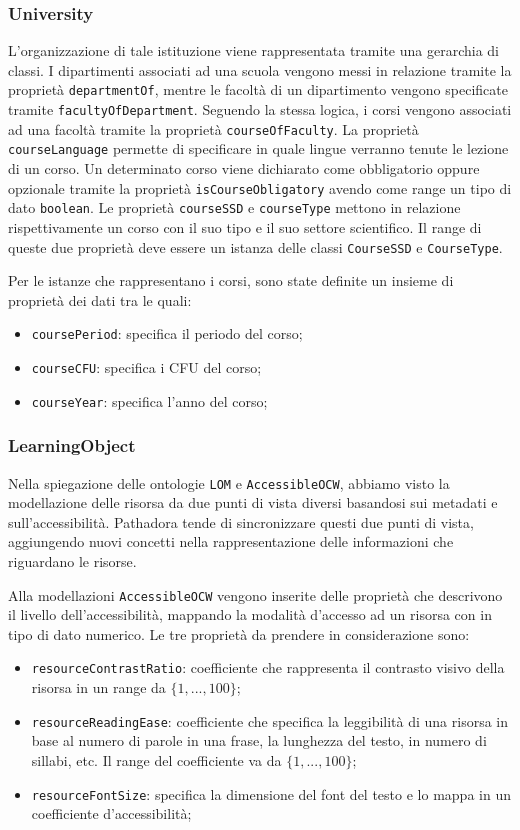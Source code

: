 \subsubsection{University}
L'organizzazione di tale istituzione viene rappresentata tramite una gerarchia di classi. I dipartimenti associati ad una scuola vengono messi in relazione tramite la proprietà \texttt{departmentOf}, mentre le facoltà di un dipartimento vengono specificate tramite \texttt{facultyOfDepartment}. Seguendo la stessa logica, i corsi vengono associati ad una facoltà tramite la proprietà \texttt{courseOfFaculty}. La proprietà \texttt{courseLanguage} permette di specificare in quale lingue verranno tenute le lezione di un corso. Un determinato corso viene dichiarato come obbligatorio oppure opzionale tramite la proprietà \texttt{isCourseObligatory} avendo come range un tipo di dato \texttt{boolean}. Le proprietà \texttt{courseSSD} e \texttt{courseType} mettono in relazione rispettivamente un corso con il suo tipo e il suo settore scientifico. Il range di queste due proprietà deve essere un istanza delle classi \texttt{CourseSSD} e \texttt{CourseType}. 

Per le istanze che rappresentano i corsi, sono state definite un insieme di proprietà dei dati tra le quali:
\begin{itemize}
    \item \texttt{coursePeriod}: specifica il periodo del corso;
    \item \texttt{courseCFU}: specifica i CFU del corso;
    \item \texttt{courseYear}: specifica l'anno del corso;
\end{itemize}

\subsubsection{LearningObject}
Nella spiegazione delle ontologie \texttt{LOM} e \texttt{AccessibleOCW}, abbiamo visto la modellazione delle risorsa da due punti di vista diversi basandosi sui metadati e sull'accessibilità. Pathadora tende di sincronizzare questi due punti di vista, aggiungendo nuovi concetti nella rappresentazione delle informazioni che riguardano le risorse.

Alla modellazioni \texttt{AccessibleOCW} vengono inserite delle proprietà che descrivono il livello dell'accessibilità, mappando la modalità d'accesso ad un risorsa con in tipo di dato numerico. Le tre proprietà da prendere in considerazione sono:
\begin{itemize}
    \item \texttt{resourceContrastRatio}: coefficiente che rappresenta il contrasto visivo della risorsa in un range da $\{1,...,100\}$;
    \item \texttt{resourceReadingEase}: coefficiente che specifica la leggibilità di una risorsa in base al numero di parole in una frase, la lunghezza del testo, in numero di sillabi, etc. Il range del coefficiente va da $\{1,...,100\}$;
    \item \texttt{resourceFontSize}: specifica la dimensione del font del testo e lo mappa in un coefficiente d'accessibilità;
\end{itemize}

